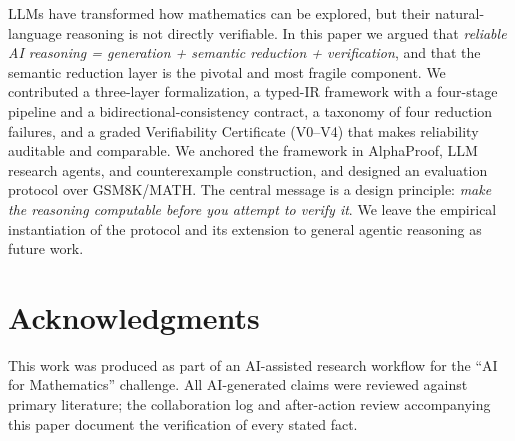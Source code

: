 \documentclass[11pt,a4paper]{article}
\theoremstyle{definition}
\theoremstyle{plain}
\begin{document}
LLMs have transformed how mathematics can be explored, but their natural-language reasoning is not
directly verifiable. In this paper we argued that \emph{reliable AI reasoning = generation + semantic
reduction + verification}, and that the semantic reduction layer is the pivotal and most fragile
component. We contributed a three-layer formalization, a typed-IR framework with a four-stage pipeline
and a bidirectional-consistency contract, a taxonomy of four reduction failures, and a graded
Verifiability Certificate (V0--V4) that makes reliability auditable and comparable. We anchored the
framework in AlphaProof, LLM research agents, and counterexample construction, and designed an
evaluation protocol over GSM8K/MATH. The central message is a design principle: \emph{make the reasoning
computable before you attempt to verify it}. We leave the empirical instantiation of the protocol and its
extension to general agentic reasoning as future work.

\section*{Acknowledgments}
This work was produced as part of an AI-assisted research workflow for the ``AI for Mathematics''
challenge. All AI-generated claims were reviewed against primary literature; the collaboration log and
after-action review accompanying this paper document the verification of every stated fact.



\end{document}
